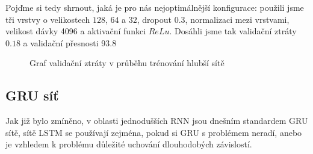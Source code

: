 Pojďme si tedy shrnout, jaká je pro nás nejoptimálnější konfigurace: použili
jsme tři vrstvy o velikostech $128$, $64$ a $32$, dropout $0.3$, normalizaci
mezi vrstvami, velikost dávky 4096 a aktivační funkci $ReLu$. Dosáhli jsme tak
validační ztráty $0.18$ a validační přesnosti 93.8%

\begin{figure}[] %
    \centering
    \caption{Graf validační ztráty v průběhu trénování hlubší sítě }
    \label{graph:deepffnn}
\end{figure}

\subsection{GRU síť}

Jak již bylo zmíněno, v oblasti jednodušších RNN jsou dnešním standardem GRU
sítě, sítě LSTM se používají zejména, pokud si GRU s problémem neradí, anebo je
vzhledem k problému důležité uchování dlouhodobých závislostí.

